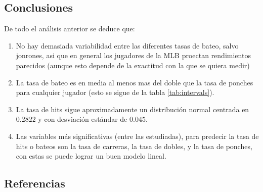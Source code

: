 \documentclass{staprojteamusb}
\begin{document}
 \hypertarget{conclusiones}{%
 \subsection{Conclusiones}\label{conclusiones}}

 De todo el análisis anterior se deduce que:

 \begin{enumerate}
 \def\labelenumi{\arabic{enumi}.}
 \item
   No hay demasiada variabilidad entre las diferentes tasas de bateo, salvo jonrones, asi que en general los jugadores de la MLB proectan rendimientos parecidos (aunque esto depende de la exactitud con la que se quiera medir)
 \item
   La tasa de bateo es en media al menos mas del doble que la tasa de ponches para cualquier jugador (esto se sigue de la tabla \ref{tab:intervals}).
 \item
   La tasa de hits sigue aproximadamente un distribución normal centrada en \(0.2822\) y con desviación estándar de \(0.045\).
 \item
   Las variables más significativas (entre las estudiadas), para predecir la tasa de hits o bateos son la tasa de carreras, la tasa de dobles, y la tasa de ponches, con estas se puede lograr un buen modelo lineal.
 \end{enumerate}

 \newpage

 \hypertarget{referencias}{%
 \subsection{Referencias}\label{referencias}}


	\nocite{*}
	\printbibliography








 \newpage
 
\end{document}
